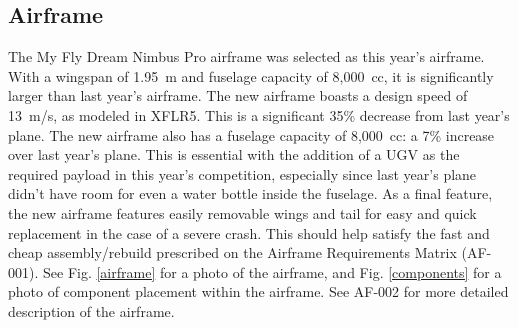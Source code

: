 \documentclass{auvsi_doc}
\begin{document}
\subsection{Airframe}
The My Fly Dream Nimbus Pro airframe was selected as this year's airframe. With a wingspan of 1.95~m and fuselage capacity of 8,000~cc, it is significantly larger than last year's airframe. The new airframe boasts a design speed of 13~m/s, as modeled in XFLR5. This is a significant 35\% decrease from last year's plane. The new airframe also has a fuselage capacity of 8,000~cc: a 7\% increase over last year's plane. This is essential with the addition of a UGV as the required payload in this year's competition, especially since last year's plane didn't have room for even a water bottle inside the fuselage. As a final feature, the new airframe features easily removable wings and tail for easy and quick replacement in the case of a severe crash. This should help satisfy the fast and cheap assembly/rebuild prescribed on the Airframe Requirements Matrix (AF-001). See Fig. \ref{airframe} for a photo of the airframe, and Fig. \ref{components} for a photo of component placement within the airframe. See AF-002 for more detailed description of the airframe. 
\end{document}
